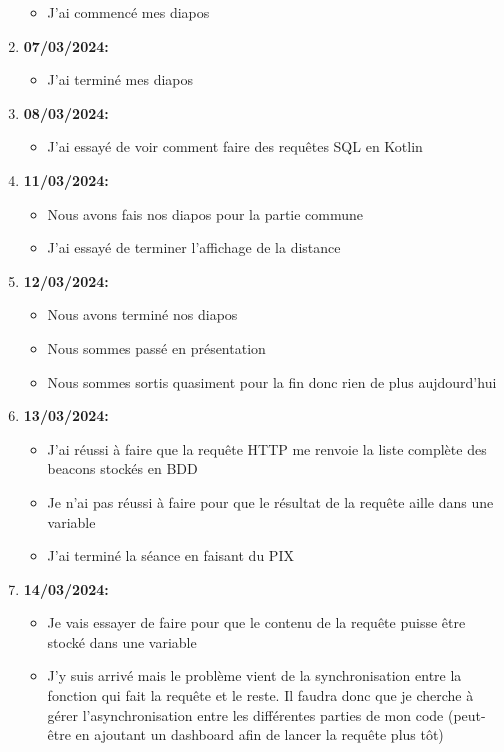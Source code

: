 \documentclass[10pt,a4paper]{book}
\begin{document}
\begin{enumerate}
\begin{itemize}
            \item J'ai commencé mes diapos
        \end{itemize}
    \item \textbf{07/03/2024:}
        \begin{itemize}
            \item J'ai terminé mes diapos
        \end{itemize}
    \item \textbf{08/03/2024:}
        \begin{itemize}
            \item J'ai essayé de voir comment faire des requêtes SQL en Kotlin
        \end{itemize}
    \item \textbf{11/03/2024:}
        \begin{itemize}
            \item Nous avons fais nos diapos pour la partie commune
            \item J'ai essayé de terminer l'affichage de la distance
        \end{itemize}
    \item \textbf{12/03/2024:}
        \begin{itemize}
            \item Nous avons terminé nos diapos
            \item Nous sommes passé en présentation
            \item Nous sommes sortis quasiment pour la fin donc rien de plus aujdourd'hui
        \end{itemize}
    \item \textbf{13/03/2024:}
        \begin{itemize}
            \item J'ai réussi à faire que la requête HTTP me renvoie la liste complète des beacons stockés en BDD
            \item Je n'ai pas réussi à faire pour que le résultat de la requête aille dans une variable
            \item J'ai terminé la séance en faisant du PIX
        \end{itemize}
    \item \textbf{14/03/2024:}
        \begin{itemize}
            \item Je vais essayer de faire pour que le contenu de la requête puisse être stocké dans une variable
            \item J'y suis arrivé mais le problème vient de la synchronisation entre la fonction qui fait la requête et le reste. Il faudra donc que je cherche à gérer l'asynchronisation entre les différentes parties de mon code (peut-être en ajoutant un dashboard afin de lancer la requête plus tôt)

\end{itemize}
\end{enumerate}
\end{document}
